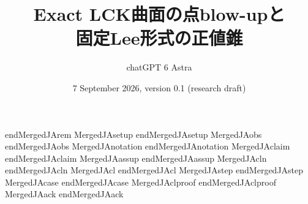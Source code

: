 \documentclass[12pt]{amsart}
\theoremstyle{definition}
\theoremstyle{remark}
\numberwithin{equation}{section}
\begin{document}
\expandafter\let\expandafter\endrem\csname endMergedJArem\endcsname
\expandafter\let\expandafter\setup\csname MergedJAsetup\endcsname
\expandafter\let\expandafter\endsetup\csname endMergedJAsetup\endcsname
\expandafter\let\expandafter\obs\csname MergedJAobs\endcsname
\expandafter\let\expandafter\endobs\csname endMergedJAobs\endcsname
\expandafter\let\expandafter\notation\csname MergedJAnotation\endcsname
\expandafter\let\expandafter\endnotation\csname endMergedJAnotation\endcsname
\expandafter\let\expandafter\claim\csname MergedJAclaim\endcsname
\expandafter\let\expandafter\endclaim\csname endMergedJAclaim\endcsname
\expandafter\let\expandafter\assup\csname MergedJAassup\endcsname
\expandafter\let\expandafter\endassup\csname endMergedJAassup\endcsname
\expandafter\let\expandafter\cln\csname MergedJAcln\endcsname
\expandafter\let\expandafter\endcln\csname endMergedJAcln\endcsname
\expandafter\let\expandafter\cl\csname MergedJAcl\endcsname
\expandafter\let\expandafter\endcl\csname endMergedJAcl\endcsname
\expandafter\let\expandafter\step\csname MergedJAstep\endcsname
\expandafter\let\expandafter\endstep\csname endMergedJAstep\endcsname
\expandafter\let\expandafter\case\csname MergedJAcase\endcsname
\expandafter\let\expandafter\endcase\csname endMergedJAcase\endcsname
\expandafter\let\expandafter\clproof\csname MergedJAclproof\endcsname
\expandafter\let\expandafter\endclproof\csname endMergedJAclproof\endcsname
\expandafter\let\expandafter\ack\csname MergedJAack\endcsname
\expandafter\let\expandafter\endack\csname endMergedJAack\endcsname
\renewcommand{\proofname}{証明}
\renewcommand{\contentsname}{目次}
\renewcommand{\refname}{参考文献}
\renewcommand{\abstractname}{要旨}

\title[点blow-upとLCK正値錐]{Exact LCK曲面の点blow-upと\\固定Lee形式の正値錐}
\author{chatGPT 6 Astra}







\date{7 September 2026, version 0.1 (research draft)}
\renewcommand{\subjclassname}{\textup{2020} Mathematics Subject Classification}
\end{document}
